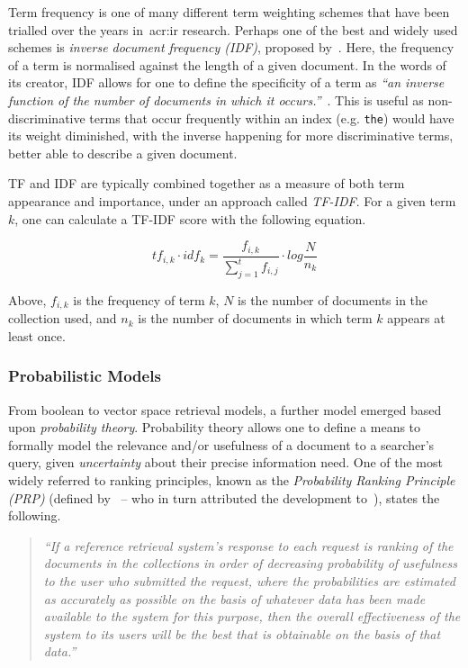 Term frequency is one of many different term weighting schemes that have been trialled over the years in~\gls{acr:ir} research. Perhaps one of the best and widely used schemes is \emph{inverse document frequency (IDF)}, proposed by~\cite{sparck1972statistical}. Here, the frequency of a term is normalised against the length of a given document. In the words of its creator, IDF allows for one to define the specificity of a term as \emph{``an inverse function of the number of documents in which it occurs.''}~\citep{sparck1972statistical}. This is useful as non-discriminative terms that occur frequently within an index (e.g. \texttt{the}) would have its weight diminished, with the inverse happening for more discriminative terms, better able to describe a given document.

TF and IDF are typically combined together as a measure of both term appearance and importance, under an approach called \emph{TF-IDF}. For a given term $k$, one can calculate a TF-IDF score with the following equation.

\begin{equation*}
tf_{i,k} \cdot idf_{k} = \frac{f_{i,k}}{\sum_{j=1}^{t} f_{i,j}} \cdot log \frac{N}{n_k}
\end{equation*}

Above, $f_{i,k}$ is the frequency of term $k$, $N$ is the number of documents in the collection used, and $n_k$ is the number of documents in which term $k$ appears at least once.

\subsubsection{Probabilistic Models}
From boolean to vector space retrieval models, a further model emerged based upon \emph{probability theory}. Probability theory allows one to define a means to formally model the relevance and/or usefulness of a document to a searcher's query, given \emph{uncertainty} about their precise information need. One of the most widely referred to ranking principles, known as the \emph{Probability Ranking Principle (PRP)} (defined by~\cite{robertson1977prp} -- who in turn attributed the development to~\cite{cooper1971relevance}), states the following.

\begin{quote}
\emph{``If a reference retrieval system's response to each request is ranking of the documents in the collections in order of decreasing probability of usefulness to the user who submitted the request, where the probabilities are estimated as accurately as possible on the basis of whatever data has been made available to the system for this purpose, then the overall effectiveness of the system to its users will be the best that is obtainable on the basis of that data.''}
\end{quote}


